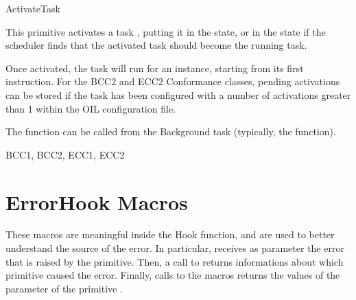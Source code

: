 \begin{function}{ActivateTask}
  
  \begin{fundescription}
    This primitive activates a task , putting it in the
     state, or in the  state if the
    scheduler finds that the activated task should become the running
    task.

    Once activated, the task will run for an instance, starting from
    its first instruction. For the BCC2 and ECC2 Conformance classes,
    pending activations can be stored if the task has been configured
    with a number of activations greater than 1 within the OIL
    configuration file.

    The function can be called from the Background task (typically,
    the  function).

  \end{fundescription}
  
  \begin{funparameters}
  \end{funparameters}
  
  \begin{funreturn}
  \end{funreturn}
  
  \begin{funconformance}
    BCC1, BCC2, ECC1, ECC2
  \end{funconformance}
\end{function}


\pagebreak



\section{ErrorHook Macros}
\label{sec:errorhook-macros}
These macros are meaningful inside the  Hook
function, and are used to better understand the source of the
error. In particular,  receives as parameter the
error that is raised by the primitive. Then, a call to
 returns informations about which
primitive caused the error. Finally, calls to the macros
 returns the values of the  parameter
of the primitive .

